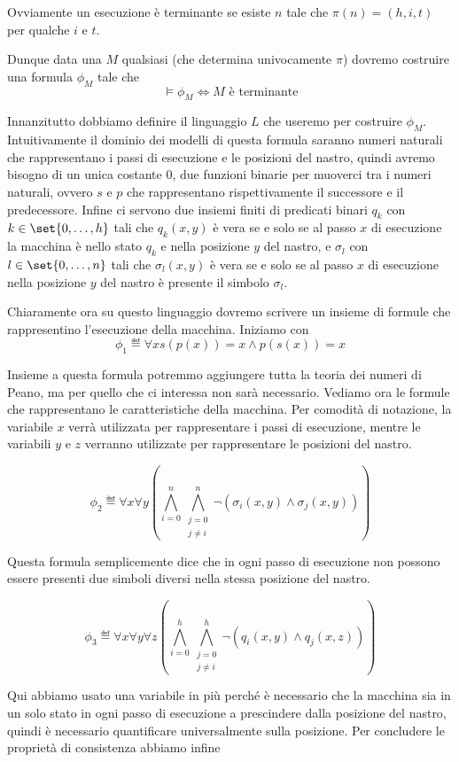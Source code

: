 Ovviamente un esecuzione è terminante se esiste \(n\) tale che \(\pi(n) = (h,i,t)\) per qualche \(i\) e \(t\).

Dunque data una \(M\) qualsiasi (che determina univocamente \(\pi\))  dovremo costruire una formula \(\phi_M\) tale che
\[\models \phi_M \iff M \text{ è terminante}\]

Innanzitutto dobbiamo definire il linguaggio \(L\) che useremo per costruire \(\phi_M\). Intuitivamente il dominio dei modelli di questa formula saranno numeri naturali che rappresentano i passi di esecuzione e le posizioni del nastro, quindi avremo bisogno di un unica costante \(0\), due funzioni binarie per muoverci tra i numeri naturali, ovvero \(s\) e \(p\) che rappresentano rispettivamente il successore e il predecessore. Infine ci servono due insiemi finiti di predicati binari \(q_k\) con \(k \in \set{0, \ldots, h}\) tali che \(q_k(x,y)\) è vera se e solo se al passo \(x\) di esecuzione la macchina è nello stato \(q_k\) e nella posizione \(y\) del nastro, e \(\sigma_l\) con \(l \in \set{0, \ldots, n}\) tali che \(\sigma_l(x,y)\) è vera se e solo se al passo \(x\) di esecuzione nella posizione \(y\) del nastro è presente il simbolo \(\sigma_l\).

Chiaramente ora su questo linguaggio dovremo scrivere un insieme di formule che rappresentino l'esecuzione della macchina. Iniziamo con
\[\phi_1 \eqdef \forall x s(p(x)) = x \land p(s(x)) = x\]

Insieme a questa formula potremmo aggiungere tutta la teoria dei numeri di Peano, ma per quello che ci interessa non sarà necessario. Vediamo ora le formule che rappresentano le caratteristiche della macchina. Per comodità di notazione, la variabile \(x\) verrà utilizzata per rappresentare i passi di esecuzione, mentre le variabili \(y\) e \(z\) verranno utilizzate per rappresentare le posizioni del nastro.

\[\phi_2 \eqdef \forall x \forall y (\bigwedge_{i=0}^{n} \bigwedge_{\substack{j=0\\j \neq i}}^{n} \neg(\sigma_i(x,y) \land \sigma_j(x,y)))\]

Questa formula semplicemente dice che in ogni passo di esecuzione non possono essere presenti due simboli diversi nella stessa posizione del nastro.

\[\phi_3 \eqdef \forall x \forall y \forall z (\bigwedge_{i=0}^{h} \bigwedge_{\substack{j=0\\j \neq i}}^{h} \neg(q_i(x,y) \land q_j(x,z)))\]

Qui abbiamo usato una variabile in più perché è necessario che la macchina sia in un solo stato in ogni passo di esecuzione a prescindere dalla posizione del nastro, quindi è necessario quantificare universalmente sulla posizione. Per concludere le proprietà di consistenza abbiamo infine

